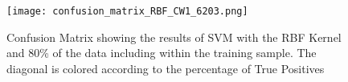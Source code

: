 \documentclass[10pt,twocolumn]{article}
\begin{document}
\begin{figure}[!t]
  \begin{center}
    \texttt{[image: confusion\_matrix\_RBF\_CW1\_6203.png]}
  \end{center}

  \caption{\small Confusion Matrix showing the results of SVM with the RBF Kernel and
  80\% of the data including within the training sample. The diagonal is colored according to
  the percentage of True Positives}
  \label{fig-3}
\end{figure}
\end{document}
